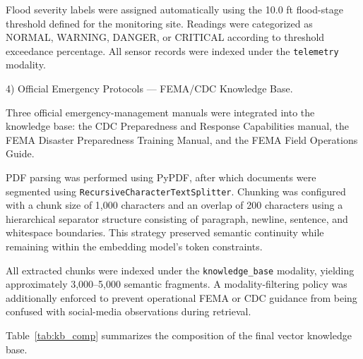 \documentclass[conference]{IEEEtran}
\begin{document}
Flood severity labels were assigned automatically using the 10.0 ft flood-stage
threshold defined for the monitoring site. Readings were categorized as NORMAL,
WARNING, DANGER, or CRITICAL according to threshold exceedance percentage. All
sensor records were indexed under the \texttt{telemetry} modality.

4) Official Emergency Protocols --- FEMA/CDC Knowledge Base.

Three official emergency-management manuals were integrated into the knowledge base:
the CDC Preparedness and Response Capabilities manual, the FEMA Disaster Preparedness
Training Manual, and the FEMA Field Operations Guide.

PDF parsing was performed using PyPDF, after which documents were segmented using
\texttt{RecursiveCharacterTextSplitter}. Chunking was configured with a chunk size
of 1,000 characters and an overlap of 200 characters using a hierarchical separator
structure consisting of paragraph, newline, sentence, and whitespace boundaries.
This strategy preserved semantic continuity while remaining within the embedding
model’s token constraints.

All extracted chunks were indexed under the \texttt{knowledge\_base} modality,
yielding approximately 3,000--5,000 semantic fragments. A modality-filtering policy
was additionally enforced to prevent operational FEMA or CDC guidance from being
confused with social-media observations during retrieval.

Table~\ref{tab:kb_comp} summarizes the composition of the final vector knowledge base.

\begin{table}[h]
\centering
\caption{Knowledge Base Composition}
\label{tab:kb_comp}


\end{table}
\end{document}
